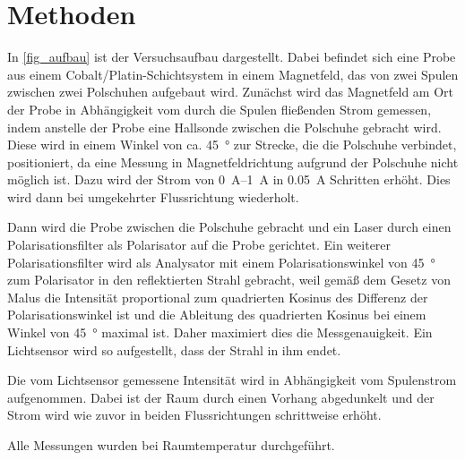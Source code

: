 \documentclass[
	a4paper,
	12pt,
	pagesize,
	ngerman
]{scrartcl}
\begin{document}
	\section{Methoden}
	In \cref{fig_aufbau} ist der Versuchsaufbau dargestellt.
	Dabei befindet sich eine Probe aus einem Cobalt/Platin-Schichtsystem in einem Magnetfeld, das von zwei Spulen zwischen zwei Polschuhen aufgebaut wird.
	Zunächst wird das Magnetfeld am Ort der Probe in Abhängigkeit vom durch die Spulen fließenden Strom gemessen, indem anstelle der Probe eine Hallsonde zwischen die Polschuhe gebracht wird.
	Diese wird in einem Winkel von ca. \SI{45}{\degree} zur Strecke, die die Polschuhe verbindet, positioniert, da eine Messung in Magnetfeldrichtung aufgrund der Polschuhe nicht möglich ist.
	Dazu wird der Strom von \SIrange{0}{1}{\ampere} in \SI{0,05}{\ampere} Schritten erhöht.
	Dies wird dann bei umgekehrter Flussrichtung wiederholt.

	Dann wird die Probe zwischen die Polschuhe gebracht und ein Laser durch einen Polarisationsfilter als Polarisator auf die Probe gerichtet.
	Ein weiterer Polarisationsfilter wird als Analysator mit einem Polarisationswinkel von \SI{45}{\degree} zum Polarisator in den reflektierten Strahl gebracht, weil gemäß dem Gesetz von Malus die Intensität proportional zum quadrierten Kosinus des Differenz der Polarisationswinkel ist und die Ableitung des quadrierten Kosinus bei einem Winkel von \SI{45}{\degree} maximal ist.
	Daher maximiert dies die Messgenauigkeit.
	Ein Lichtsensor wird so aufgestellt, dass der Strahl in ihm endet.
	
	Die vom Lichtsensor gemessene Intensität wird in Abhängigkeit vom Spulenstrom aufgenommen.
	Dabei ist der Raum durch einen Vorhang abgedunkelt und der Strom wird wie zuvor in beiden Flussrichtungen schrittweise erhöht.
	
	Alle Messungen wurden bei Raumtemperatur durchgeführt.
	
\end{document}
